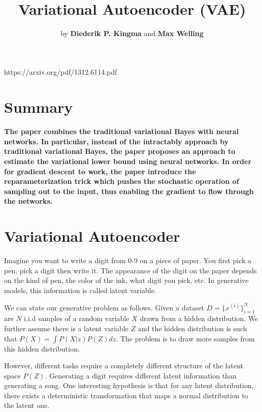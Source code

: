 \documentclass[graybox]{svmult}
\begin{document}
\title*{Variational Autoencoder (VAE)}
\author{by \textbf{Diederik P. Kingma} and \textbf{Max Welling}}

%
%
\maketitle

https://arxiv.org/pdf/1312.6114.pdf


\section{Summary}
\label{sec:1}

\paragraph{The paper combines the traditional variational Bayes with neural networks. In particular, instead of the intractably approach by traditional variational Bayes, the paper proposes an approach to estimate the variational lower bound using neural networks. In order for gradient descent to work, the paper introduce the \textbf{reparameterization trick} which pushes the stochastic operation of sampling out to the input, thus enabling the gradient to flow through the networks.}

\section{Variational Autoencoder}

Imagine you want to write a digit from 0-9 on a piece of paper. You first pick a pen, pick a digit then write it. The appearance of the digit on the paper depends on the kind of pen, the color of the ink, what digit you pick, etc. In generative models, this information is called latent variable.

We can state our generative problem as follows. Given a dataset $D = \{x^{(i)}\}^N_{i=1}$ are $N$ i.i.d samples of a random variable $X$ drawn from a hidden distribution. We further assume there is a latent variable $Z$ and the hidden distribution is such that $P(X) = \int P(X|z)P(Z) dz$. The problem is to draw more samples from this hidden distribution.

However, different tasks require a completely different structure of the latent space $P(Z)$. Generating a digit requires different latent information than generating a song. One interesting hypothesis is that for any latent distribution, there exists a deterministic transformation that maps a normal distribution to the latent one.
\end{document}
